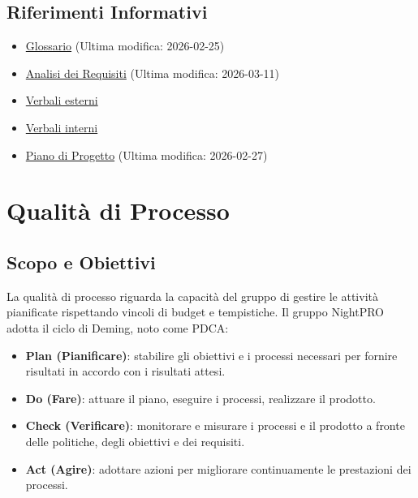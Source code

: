 \documentclass[a4paper,11pt,oneside]{scrartcl}
\begin{document}
\subsection{Riferimenti Informativi}
\begin{itemize}
    \item \href{https://github.com/swenightpro/Documentazione/blob/main/docs/RTB/Documentazione%20Esterna}{Glossario} (Ultima modifica: 2026-02-25)
    \item \href{https://github.com/swenightpro/Documentazione/tree/main/docs/RTB/Documentazione%20Esterna}{Analisi dei Requisiti} (Ultima modifica: 2026-03-11)
    \item \href{https://github.com/swenightpro/Documentazione/tree/main/docs/RTB/Documentazione%20Esterna/Verbali%20Esterni}{Verbali esterni}
    \item \href{https://github.com/swenightpro/Documentazione/tree/main/docs/RTB/Documentazione%20Interna/Verbali%20Interni}{Verbali interni}
    \item \href{https://github.com/swenightpro/Documentazione/tree/main/docs/RTB/Documentazione%20Esterna}{Piano di Progetto} (Ultima modifica: 2026-02-27)
\end{itemize}

\newpage
\section{Qualità di Processo}

\subsection{Scopo e Obiettivi}
La qualità di processo riguarda la capacità del gruppo di gestire le attività pianificate rispettando vincoli di budget e tempistiche. Il gruppo NightPRO adotta il ciclo di Deming{\scriptsize{}}, noto come PDCA{\scriptsize{}}:

\begin{itemize}
    \item \textbf{Plan (Pianificare)}: stabilire gli obiettivi e i processi necessari per fornire risultati in accordo con i risultati attesi.
    \item \textbf{Do (Fare)}: attuare il piano, eseguire i processi, realizzare il prodotto.
    \item \textbf{Check (Verificare)}: monitorare e misurare i processi e il prodotto a fronte delle politiche, degli obiettivi e dei requisiti.
    \item \textbf{Act (Agire)}: adottare azioni per migliorare continuamente le prestazioni dei processi.
\end{itemize}
\end{document}
